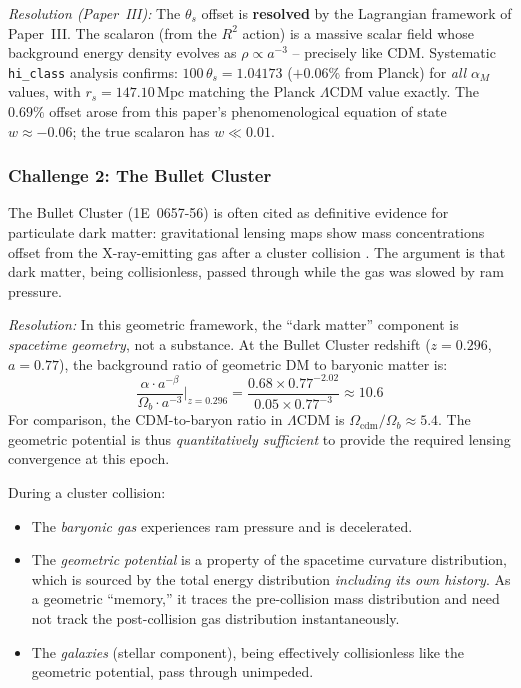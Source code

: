 \documentclass[aps,prd,twocolumn,superscriptaddress,nofootinbib,floatfix]{revtex4-2}
\begin{document}
\textit{Resolution (Paper~III):} The $\theta_s$ offset is \textbf{resolved} by the Lagrangian framework of Paper~III. The scalaron (from the $R^2$ action) is a massive scalar field whose background energy density evolves as $\rho \propto a^{-3}$ -- precisely like CDM. Systematic \texttt{hi\_class} analysis confirms: $100\,\theta_s = 1.04173$ ($+0.06\%$ from Planck) for \textit{all} $\alpha_M$ values, with $r_s = 147.10\,\text{Mpc}$ matching the Planck $\Lambda$CDM value exactly. The $0.69\%$ offset arose from this paper's phenomenological equation of state $w \approx -0.06$; the true scalaron has $w \ll 0.01$.

\subsubsection{Challenge 2: The Bullet Cluster}

The Bullet Cluster (1E~0657-56) is often cited as definitive evidence for particulate dark matter: gravitational lensing maps show mass concentrations offset from the X-ray-emitting gas after a cluster collision \cite{Clowe2006}. The argument is that dark matter, being collisionless, passed through while the gas was slowed by ram pressure.

\textit{Resolution:} In this geometric framework, the ``dark matter'' component is \textit{spacetime geometry}, not a substance. At the Bullet Cluster redshift ($z = 0.296$, $a = 0.77$), the background ratio of geometric DM to baryonic matter is:
\begin{equation}
\frac{\alpha \cdot a^{-\beta}}{\Omega_b \cdot a^{-3}} \bigg|_{z=0.296} = \frac{0.68 \times 0.77^{-2.02}}{0.05 \times 0.77^{-3}} \approx 10.6
\end{equation}
For comparison, the CDM-to-baryon ratio in $\Lambda$CDM is $\Omega_{\mathrm{cdm}}/\Omega_b \approx 5.4$. The geometric potential is thus \textit{quantitatively sufficient} to provide the required lensing convergence at this epoch.

During a cluster collision:
\begin{itemize}
\item The \textit{baryonic gas} experiences ram pressure and is decelerated.
\item The \textit{geometric potential} is a property of the spacetime curvature distribution, which is sourced by the total energy distribution \textit{including its own history}. As a geometric ``memory,'' it traces the pre-collision mass distribution and need not track the post-collision gas distribution instantaneously.
\item The \textit{galaxies} (stellar component), being effectively collisionless like the geometric potential, pass through unimpeded.
\end{itemize}
\end{document}
